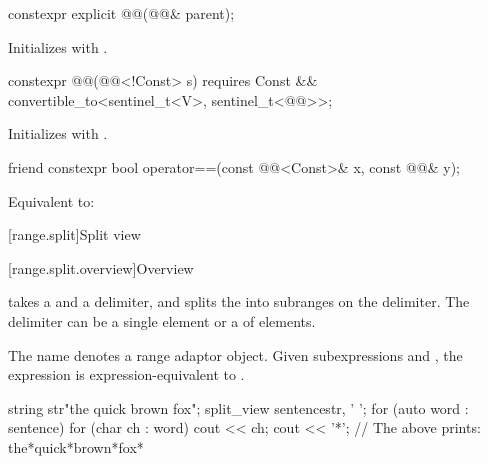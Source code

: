%
\begin{itemdecl}
constexpr explicit @@(@@& parent);
\end{itemdecl}

\begin{itemdescr}
\pnum
\effects
Initializes  with .
\end{itemdescr}

%
\begin{itemdecl}
constexpr @@(@@<!Const> s)
  requires Const && convertible_to<sentinel_t<V>, sentinel_t<@@>>;
\end{itemdecl}

\begin{itemdescr}
\pnum
\effects
Initializes  with .
\end{itemdescr}


\begin{itemdecl}
friend constexpr bool operator==(const @@<Const>& x, const @@& y);
\end{itemdecl}

\begin{itemdescr}
\pnum
\effects
Equivalent to: 
\end{itemdescr}

[range.split]{Split view}

[range.split.overview]{Overview}

\pnum
{} takes a  and a delimiter, and splits
the  into subranges on the delimiter. The delimiter can be
a single element or a  of elements.

\pnum
The name  denotes a
range adaptor object.
Given subexpressions  and ,
the expression  is expression-equivalent to
.

\pnum
\begin{example}
\begin{codeblock}
string str{"the quick brown fox"};
split_view sentence{str, ' '};
for (auto word : sentence) {
  for (char ch : word)
    cout << ch;
  cout << '*';
}
// The above prints: the*quick*brown*fox*
\end{codeblock}
\end{example}

